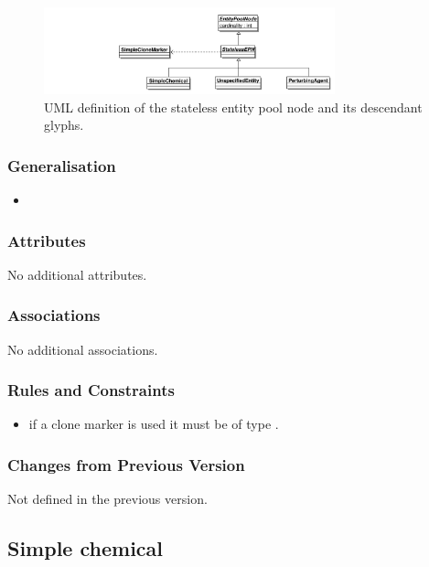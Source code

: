 \begin{figure}[htb]
  \centering
  \includegraphics[width=0.75\textwidth]{images/statelessepnuml}
  \caption{UML definition of the stateless entity pool node and its
    descendant glyphs.}
  \label{fig:statelessepnuml}
\end{figure}

\subsubsection{Generalisation}

\begin{itemize}
\item {}
\end{itemize}

\subsubsection{Attributes}

No additional attributes.

\subsubsection{Associations}

No additional associations.

\subsubsection{Rules and Constraints}

\begin{itemize}
\item if a clone marker is used it must be of type .
\end{itemize}

\subsubsection{Changes from Previous Version}

Not defined in the previous version.

\subsection{Simple chemical}
\label{sec:simpleChemical}

